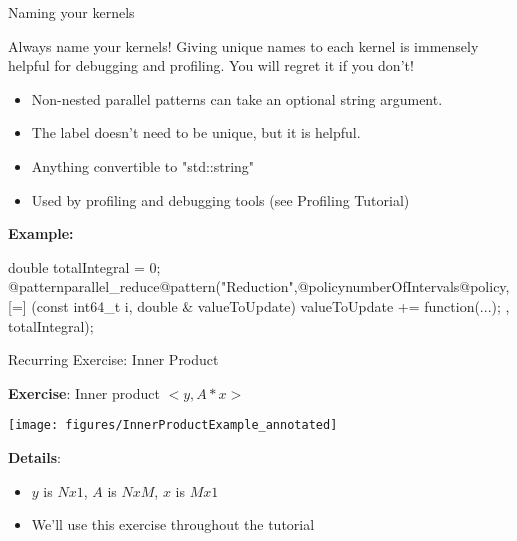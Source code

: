 
\begin{frame}[fragile]{Naming your kernels}
  \vspace{-10pt}
  \begin{alertblock}{Always name your kernels!}
     Giving unique names to each kernel is immensely helpful for debugging and profiling. You will regret it if you don't!
  \end{alertblock}
 
  \begin{itemize}
     \item Non-nested parallel patterns can take an optional string argument.
     \item The label doesn't need to be unique, but it is helpful.
     \item Anything convertible to "std::string"
     \item Used by profiling and debugging tools (see Profiling Tutorial)
  \end{itemize}
  \textbf{Example:} 
  \begin{code}[linebackgroundcolor={
        \btLstHL<1->{4}{bodyColor}
      },
      frame=single
    ]
double totalIntegral = 0;
@patternparallel_reduce@pattern("Reduction",@policynumberOfIntervals@policy,
  [=] (const int64_t i, double & valueToUpdate) {
    valueToUpdate += function(...);
  },
  totalIntegral);
  \end{code}
\end{frame}


\begin{frame}[fragile]{Recurring Exercise: Inner Product}

  \textbf{Exercise}: Inner product $<y, A * x>$

  \vspace{-10pt}

  \begin{center}
    \texttt{[image: figures/InnerProductExample\_annotated]}
  \end{center}

  \vspace{-15pt}

  \textbf{Details}:
  \begin{itemize}
    \item $y$ is $Nx1$, $A$ is $NxM$, $x$ is $Mx1$
    \item We'll use this exercise throughout the tutorial
  \end{itemize}

\end{frame}

